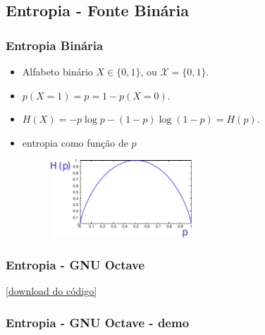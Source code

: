 \subsection{Entropia - Fonte Binária}
\begin{frame}%
  \frametitle{Entropia Binária}
  \begin{itemize}
  \item Alfabeto binário $X \in \{0,1\}$, ou $\mathcal{X} = \{0,1\}$.
  \item $p(X=1)=p=1-p(X=0)$.
  \item $H(X) = -p \log p - (1-p) \log (1-p) = H(p)$.
  \item entropia como função de $p$

  \begin{figure}[h!]
  \centering
  \includegraphics[width=0.5\textwidth]{images/graph_Hp.pdf}
  \label{fig:graph_Hp}
  \end{figure}
  \end{itemize}
\end{frame}


\begin{frame}%
  \frametitle{Entropia - GNU Octave}
  

  \href{https://raw.githubusercontent.com/leolca/clscripts/master/entropy.m}{[download do código]}
\end{frame}

\begin{frame}%
  \frametitle{Entropia - GNU Octave - demo}
  
\end{frame}
